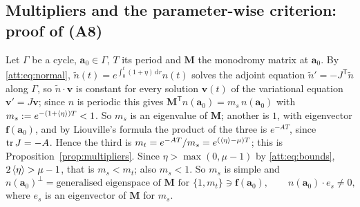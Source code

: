 \subsection{Multipliers and the parameter-wise criterion: proof of (A8)}\label{att:sec:mult}
Let $\Gamma$ be a cycle, $\mathbf a_0\in\Gamma$, $T$ its period and $\mathbf M$ the monodromy matrix at $\mathbf a_0$. By \eqref{att:eq:normal}, $\tilde n(t)=e^{\int_0^t(1+\eta)\,\mathrm dr}n(t)$ solves the adjoint equation $\tilde n'=-J^{\mathsf T}\tilde n$ along $\Gamma$, so $\tilde n\cdot\mathbf v$ is constant for every solution $\mathbf v(t)$ of the variational equation $\mathbf v'=J\mathbf v$; since $n$ is periodic this gives $\mathbf M^{\mathsf T}n(\mathbf a_0)=m_s\,n(\mathbf a_0)$ with $m_s:=e^{-(1+\left\langle \eta\right\rangle)T}<1$. So $m_s$ is an eigenvalue of $\mathbf M$; another is $1$, with eigenvector $\mathbf f(\mathbf a_0)$, and by Liouville's formula the product of the three is $e^{-AT}$, since $\operatorname{tr} J=-A$. Hence the third is $m_t=e^{-AT}/m_s=e^{(\left\langle \eta\right\rangle-\mu)T}$; this is Proposition~\ref{prop:multipliers}. Since $\eta>\max(0,\mu-1)$ by \eqref{att:eq:bounds}, $2\left\langle \eta\right\rangle>\mu-1$, that is $m_s<m_t$; also $m_s<1$. So $m_s$ is simple and
\begin{equation}\label{att:eq:nperp}
n(\mathbf a_0)^\perp=\text{generalised eigenspace of }\mathbf M\text{ for }\{1,m_t\}\ni\mathbf f(\mathbf a_0),\qquad n(\mathbf a_0)\cdot e_s\ne0,
\end{equation}
where $e_s$ is an eigenvector of $\mathbf M$ for $m_s$.

